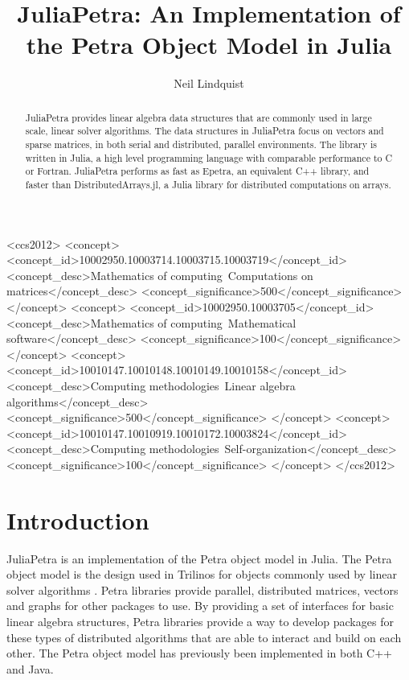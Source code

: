 \documentclass[acmsmall]{acmart}
\title{JuliaPetra: An Implementation of the Petra Object Model in Julia}
\author{Neil Lindquist}
\begin{document}
\begin{CCSXML}
<ccs2012>
	<concept>
		<concept_id>10002950.10003714.10003715.10003719</concept_id>
		<concept_desc>Mathematics of computing~Computations on matrices</concept_desc>
		<concept_significance>500</concept_significance>
	</concept>
	<concept>
		<concept_id>10002950.10003705</concept_id>
		<concept_desc>Mathematics of computing~Mathematical software</concept_desc>
		<concept_significance>100</concept_significance>
	</concept>
	<concept>
		<concept_id>10010147.10010148.10010149.10010158</concept_id>
		<concept_desc>Computing methodologies~Linear algebra algorithms</concept_desc>
		<concept_significance>500</concept_significance>
	</concept>
	<concept>
		<concept_id>10010147.10010919.10010172.10003824</concept_id>
		<concept_desc>Computing methodologies~Self-organization</concept_desc>
		<concept_significance>100</concept_significance>
	</concept>
</ccs2012>
\end{CCSXML}


\begin{abstract}
JuliaPetra provides linear algebra data structures that are commonly used in large scale, linear solver algorithms.
The data structures in JuliaPetra focus on vectors and sparse matrices, in both serial and
distributed, parallel environments.
The library is written in Julia, a high level programming language with comparable performance to C or Fortran.
JuliaPetra performs as fast as Epetra, an equivalent C++ library, and faster than DistributedArrays.jl, a Julia
library for distributed computations on arrays.
\end{abstract}

\maketitle

\section{Introduction}

JuliaPetra is an implementation of the Petra object model in Julia.
The Petra object model is the design used in Trilinos for objects commonly used by linear solver algorithms
\cite{Heroux:2005:Trilinos}.
Petra libraries provide parallel, distributed matrices, vectors and graphs for other packages to use.
By providing a set of interfaces for basic linear algebra structures, Petra libraries provide a way
to develop packages for these types of distributed algorithms that are able to interact and build on each other.
The Petra object model has previously been implemented in both C++ and Java.
\end{document}
